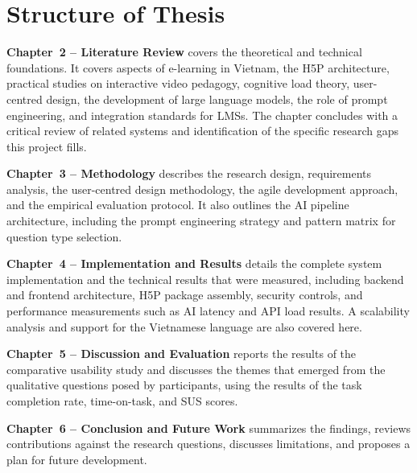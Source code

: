 \section{Structure of Thesis}

\textbf{Chapter~2 -- Literature Review} covers the theoretical and technical foundations. It covers aspects of e-learning in Vietnam, the H5P architecture, practical studies on interactive video pedagogy, cognitive load theory, user-centred design, the development of large language models, the role of prompt engineering, and integration standards for LMSs. The chapter concludes with a critical review of related systems and identification of the specific research gaps this project fills.

\textbf{Chapter~3 -- Methodology} describes the research design, requirements analysis, the user-centred design methodology, the agile development approach, and the empirical evaluation protocol. It also outlines the AI pipeline architecture, including the prompt engineering strategy and pattern matrix for question type selection.

\textbf{Chapter~4 -- Implementation and Results} details the complete system implementation and the technical results that were measured, including backend and frontend architecture, H5P package assembly, security controls, and performance measurements such as AI latency and API load results. A scalability analysis and support for the Vietnamese language are also covered here.

\textbf{Chapter~5 -- Discussion and Evaluation} reports the results of the comparative usability study and discusses the themes that emerged from the qualitative questions posed by participants, using the results of the task completion rate, time-on-task, and SUS scores.

\textbf{Chapter~6 -- Conclusion and Future Work} summarizes the findings, reviews contributions against the research questions, discusses limitations, and proposes a plan for future development.
